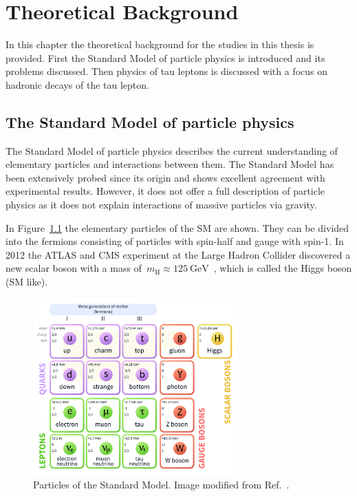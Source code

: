 \chapter{Theoretical Background}
\label{sec:theory}

In this chapter the theoretical background for the studies in this thesis is
provided. First the Standard Model of particle physics is introduced and its
problems discussed. Then physics of tau leptons is discussed with a focus on
hadronic decays of the tau lepton.

\section{The Standard Model of particle physics}

The Standard Model of particle physics describes the current understanding of
elementary particles and interactions between them. The Standard Model has been
extensively probed since its origin and shows excellent agreement with
experimental results. However, it does not offer a full description of particle
physics as it does not explain interactions of massive particles via gravity.

In Figure~\ref{fig:sm_particles} the elementary particles of the SM are shown.
They can be divided into the fermions consisting of particles with spin-half and
gauge with spin-1. In 2012 the ATLAS and CMS experiment at the Large Hadron
Collider discovered a new scalar boson with a mass
of~$m_\text{H} \approx \SI{125}{\GeV}$~\cite{higgs_atlas, higgs_cms}, which is
called the Higgs boson (SM like).

\begin{figure}[htb]
  \centering
  \includegraphics[width=0.7\textwidth]{./figures/theory/sm_particles.pdf}
  \caption{Particles of the Standard Model. Image modified from
    Ref.~\cite{sm_wiki}.}
  \label{fig:sm_particles}
\end{figure}

